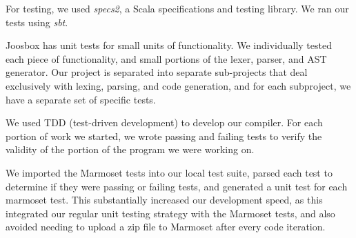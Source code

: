 \documentclass[letterpaper]{article}
\begin{document}
  For testing, we used {\em specs2}, a Scala specifications and testing library.
  We ran our tests using {\em sbt}.

  Joosbox has unit tests for small units of functionality. We individually
  tested each piece of functionality, and small portions of the lexer, parser,
  and AST generator. Our project is separated into separate sub-projects that
  deal exclusively with lexing, parsing, and code generation, and for each
  subproject, we have a separate set of specific tests.

  We used TDD (test-driven development) to develop our compiler. For each
  portion of work we started, we wrote passing and failing tests to verify the
  validity of the portion of the program we were working on.

  We imported the Marmoset tests into our local test suite, parsed each test to
  determine if they were passing or failing tests, and generated a unit test for
  each marmoset test. This substantially increased our development speed, as
  this integrated our regular unit testing strategy with the Marmoset tests, and
  also avoided needing to upload a zip file to Marmoset after every code
  iteration.
\end{document}
